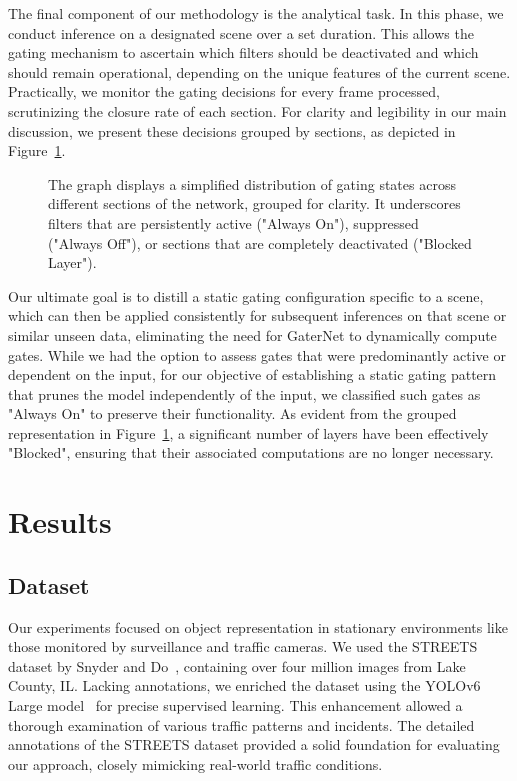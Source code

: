 \documentclass[runningheads]{llncs}
\begin{document}
The final component of our methodology is the analytical task. In this phase, we conduct inference on a designated scene over a set duration. This allows the gating mechanism to ascertain which filters should be deactivated and which should remain operational, depending on the unique features of the current scene. Practically, we monitor the gating decisions for every frame processed, scrutinizing the closure rate of each section. For clarity and legibility in our main discussion, we present these decisions grouped by sections, as depicted in Figure~\ref{fig:gating_analysis}.

\begin{figure}[htbp]
\centering

\caption{The graph displays a simplified distribution of gating states across different sections of the network, grouped for clarity. It underscores filters that are persistently active ("Always On"), suppressed ("Always Off"), or sections that are completely deactivated ("Blocked Layer").}
\label{fig:gating_analysis}
\end{figure}

Our ultimate goal is to distill a static gating configuration specific to a scene, which can then be applied consistently for subsequent inferences on that scene or similar unseen data, eliminating the need for GaterNet to dynamically compute gates. While we had the option to assess gates that were predominantly active or dependent on the input, for our objective of establishing a static gating pattern that prunes the model independently of the input, we classified such gates as "Always On" to preserve their functionality. As evident from the grouped representation in Figure~\ref{fig:gating_analysis}, a significant number of layers have been effectively "Blocked", ensuring that their associated computations are no longer necessary.

\section{Results}
\subsection{Dataset}
Our experiments focused on object representation in stationary environments like those monitored by surveillance and traffic cameras. We used the STREETS dataset by Snyder and Do~\cite{snyder2019streets}, containing over four million images from Lake County, IL. Lacking annotations, we enriched the dataset using the YOLOv6 Large model~\cite{li2023yolov6,li2022yolov6} for precise supervised learning. This enhancement allowed a thorough examination of various traffic patterns and incidents. The detailed annotations of the STREETS dataset provided a solid foundation for evaluating our approach, closely mimicking real-world traffic conditions.
\end{document}
